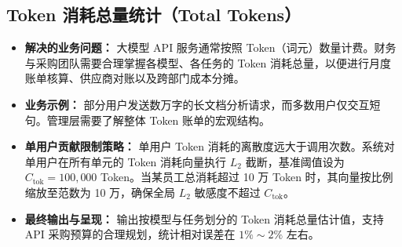 \subsection{Token 消耗总量统计（Total Tokens）}
\begin{itemize}[leftmargin=2em]
  \item \textbf{解决的业务问题：} 大模型 API 服务通常按照 Token（词元）数量计费。财务与采购团队需要合理掌握各模型、各任务的 Token 消耗总量，以便进行月度账单核算、供应商对账以及跨部门成本分摊。
  \item \textbf{业务示例：} 部分用户发送数万字的长文档分析请求，而多数用户仅交互短句。管理层需要了解整体 Token 账单的宏观结构。
  \item \textbf{单用户贡献限制策略：} 单用户 Token 消耗的离散度远大于调用次数。系统对单用户在所有单元的 Token 消耗向量执行 $L_2$ 截断，基准阈值设为 $C_{\text{tok}} = 100,000$ Token。当某员工总消耗超过 10 万 Token 时，其向量按比例缩放至范数为 10 万，确保全局 $L_2$ 敏感度不超过 $C_{\text{tok}}$。
  \item \textbf{最终输出与呈现：} 输出按模型与任务划分的 Token 消耗总量估计值，支持 API 采购预算的合理规划，统计相对误差在 $1\% \sim 2\%$ 左右。
\end{itemize}

